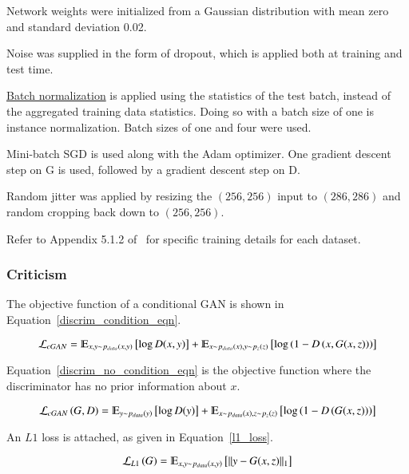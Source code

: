 \documentclass[a4paper, 12pt]{article}
\DeclarePairedDelimiter\norm{\lVert}{\rVert}%
\begin{document}
Network weights were initialized from a Gaussian distribution with mean zero
and standard deviation 0.02.

Noise was supplied in the form of dropout, which is applied both at training
and test time.

\hyperref[batchnorm]{Batch normalization} is applied using the statistics of
the test batch, instead of the aggregated training data statistics. Doing so
with a batch size of one is instance
normalization\citet{DBLP:journals/corr/UlyanovVL16}. Batch sizes of one and four
were used.

Mini-batch SGD is used along with the Adam optimizer. One gradient descent step
on G is used, followed by a gradient descent step on D.

Random jitter was applied by resizing the $(256, 256)$ input to $(286, 286)$
and random cropping back down to $(256, 256)$.

Refer to Appendix 5.1.2 of~\citet{DBLP:journals/corr/IsolaZZE16} for specific
training details for each dataset.

\subsubsection{Criticism}

The objective function of a conditional GAN is shown in Equation~\ref{discrim_condition_eqn}.

\begin{equation}
        \mathcal{L}_{cGAN} = \varmathbb{E}_{x, y \sim p_{data}(x, y)}\left[\log D(x, y)\right] +
                             \varmathbb{E}_{x \sim p_{data}(x), y \sim p_z (z)}\left[\log \left(1 - D\left(x, G(x, z)\right)\right)\right]
        \label{discrim_condition_eqn}
\end{equation}

Equation~\ref{discrim_no_condition_eqn} is the objective function where the
discriminator has no prior information about $x$.

\begin{equation}
        \mathcal{L}_{cGAN}\left(G, D\right) =
                \varmathbb{E}_{y \sim p_{data}(y)}\left[\log D(y)\right] +
                \varmathbb{E}_{x \sim p_{data}(x), z \sim p_z (z)}\left[\log \left(1 - D\left(G(x, z)\right)\right)\right]
        \label{discrim_no_condition_eqn}
\end{equation}

An $L1$ loss is attached, as given in Equation~\ref{l1_loss}.

\begin{equation}
        \mathcal{L}_{L1}\left(G\right) = \varmathbb{E}_{x, y \sim p_{data}(x, y)}\left[\norm{y - G(x, z)}_1\right]
        \label{l1_loss}
\end{equation}
\end{document}
